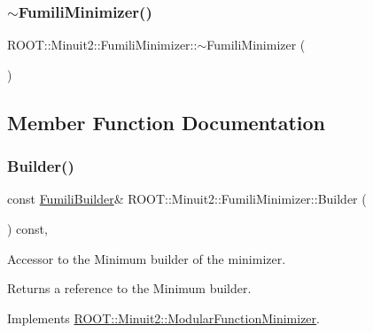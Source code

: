 \subsubsection{\texorpdfstring{$\sim$FumiliMinimizer()}{~FumiliMinimizer()}\hspace{0.1cm}{\footnotesize\ttfamily [2/2]}}
{\footnotesize\ttfamily R\+O\+O\+T\+::\+Minuit2\+::\+Fumili\+Minimizer\+::$\sim$\+Fumili\+Minimizer (\begin{DoxyParamCaption}{ }\end{DoxyParamCaption})\hspace{0.3cm}{\ttfamily [inline]}}



\subsection{Member Function Documentation}
\mbox{\label{classROOT_1_1Minuit2_1_1FumiliMinimizer_a24d20e7cd4a335f60616fd7cafe0739c}} 
\subsubsection{\texorpdfstring{Builder()}{Builder()}\hspace{0.1cm}{\footnotesize\ttfamily [1/2]}}
{\footnotesize\ttfamily const \mbox{\hyperlink{classROOT_1_1Minuit2_1_1FumiliBuilder}{Fumili\+Builder}}\& R\+O\+O\+T\+::\+Minuit2\+::\+Fumili\+Minimizer\+::\+Builder (\begin{DoxyParamCaption}{ }\end{DoxyParamCaption}) const\hspace{0.3cm}{\ttfamily [inline]}, {\ttfamily [virtual]}}

Accessor to the Minimum builder of the minimizer.

\begin{DoxyReturn}{Returns}
a reference to the Minimum builder. 
\end{DoxyReturn}


Implements \mbox{\hyperlink{classROOT_1_1Minuit2_1_1ModularFunctionMinimizer_a13e98551cf14e927c61e1e34ecf8ba8b}{R\+O\+O\+T\+::\+Minuit2\+::\+Modular\+Function\+Minimizer}}.

\mbox{\label{classROOT_1_1Minuit2_1_1FumiliMinimizer_a24d20e7cd4a335f60616fd7cafe0739c}} 
